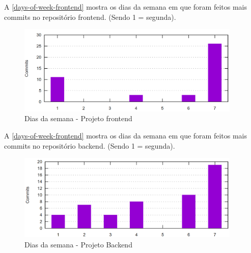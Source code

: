 A \autoref{days-of-week-frontend} mostra os dias da semana em que foram feitos mais commits no repositório \gls{frontend}. (Sendo 1 = segunda).
\begin{figure}[H]
	\centering
	\caption{\label{days-of-week-frontend}Dias da semana - Projeto \gls{frontend}}
	\includegraphics[width=0.95\textwidth]{../imagens/stats/days-of-week-frontend.png}
\end{figure}

A \autoref{days-of-week-frontend} mostra os dias da semana em que foram feitos mais commits no repositório backend. (Sendo 1 = segunda).
\begin{figure}[H]
	\centering
	\caption{\label{days-of-week-backend}Dias da semana - Projeto Backend}
	\includegraphics[width=0.95\textwidth]{../imagens/stats/days-of-week-backend.png}
\end{figure}